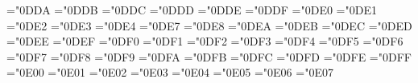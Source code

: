 \let\mUpEquilibrium=\UpEquilibrium 
\mathchardef\ReverseUpEquilibrium ="0DDA
\let\mReverseUpEquilibrium=\ReverseUpEquilibrium 
\mathchardef\vdash ="0DDB
\let\mRightTee=\vdash 
\mathchardef\dashv ="0DDC
\let\mLeftTee=\dashv 
\mathchardef\DownTee ="0DDD
\let\mDownTee=\DownTee 
\mathchardef\models ="0DDE
\let\mDoubleRightTee=\models 
\mathchardef\DoubleLeftTee ="0DDF
\let\mDoubleLeftTee=\DoubleLeftTee 
\mathchardef\bumpeq ="0DE0
\let\mHumpEqual=\bumpeq 
\mathchardef\NotHumpEqual ="0DE1
\let\mNotHumpEqual=\NotHumpEqual 
\mathchardef\HumpDownHump ="0DE2
\let\mHumpDownHump=\HumpDownHump 
\mathchardef\NotHumpDownHump ="0DE3
\let\mNotHumpDownHump=\NotHumpDownHump 
\mathchardef\doteq ="0DE4
\let\mDotEqual=\doteq 
\def\mColon{\@unicode{Colon}}
\def\mEqual{\@unicode{Equal}}
\mathchardef\LongEqual ="0DE7
\let\mLongEqual=\LongEqual 
\mathchardef\surd ="0DE8
\let\mSqrt=\surd 
\def\mVerticalBar{\@unicode{VerticalBar}}
\mathchardef\NotVerticalBar ="0DEA
\let\mNotVerticalBar=\NotVerticalBar 
\mathchardef\Vert ="0DEB
\let\mDoubleVerticalBar=\Vert 
\mathchardef\NotDoubleVerticalBar ="0DEC
\let\mNotDoubleVerticalBar=\NotDoubleVerticalBar 
\mathchardef\neg ="0DED
\let\mNot=\neg 
\mathchardef\wr ="0DEE
\let\mVerticalTilde=\wr 
\mathchardef\times ="0DEF
\let\mTimes=\times 
\mathchardef\InvisibleTimes ="0DF0
\let\mInvisibleTimes=\InvisibleTimes 
\mathchardef\pm ="0DF1
\let\mPlusMinus=\pm 
\mathchardef\mp ="0DF2
\let\mMinusPlus=\mp 
\mathchardef\div ="0DF3
\let\mDivide=\div 
\mathchardef\cdot ="0DF4
\let\mCenterDot=\cdot 
\mathchardef\SmallCircle ="0DF5
\let\mSmallCircle=\SmallCircle 
\mathchardef\times ="0DF6
\let\mCross=\times 
\mathchardef\oplus ="0DF7
\let\mCirclePlus=\oplus 
\mathchardef\ominus ="0DF8
\let\mCircleMinus=\ominus 
\mathchardef\otimes ="0DF9
\let\mCircleTimes=\otimes 
\mathchardef\odot ="0DFA
\let\mCircleDot=\odot 
\mathchardef\Star ="0DFB
\let\mStar=\Star 
\mathchardef\Square ="0DFC
\let\mSquare=\Square 
\mathchardef\diamond ="0DFD
\let\mDiamond=\diamond 
\mathchardef\nabla ="0DFE
\let\mDel=\nabla 
\mathchardef\setminus ="0DFF
\let\mBackslash=\setminus 
\mathchardef\frown ="0E00
\let\mCap=\frown 
\mathchardef\smile ="0E01
\let\mCup=\smile 
\mathchardef\amalg ="0E02
\let\mCoproduct=\amalg 
\mathchardef\int ="0E03
\let\mIntegral=\int 
\mathchardef\oint ="0E04
\let\mContourIntegral=\oint 
\mathchardef\DoubleContourIntegral ="0E05
\let\mDoubleContourIntegral=\DoubleContourIntegral 
\mathchardef\CounterClockwiseContourIntegral ="0E06
\let\mCounterClockwiseContourIntegral=\CounterClockwiseContourIntegral 
\mathchardef\ClockwiseContourIntegral ="0E07
\let\mClockwiseContourIntegral=\ClockwiseContourIntegral 
